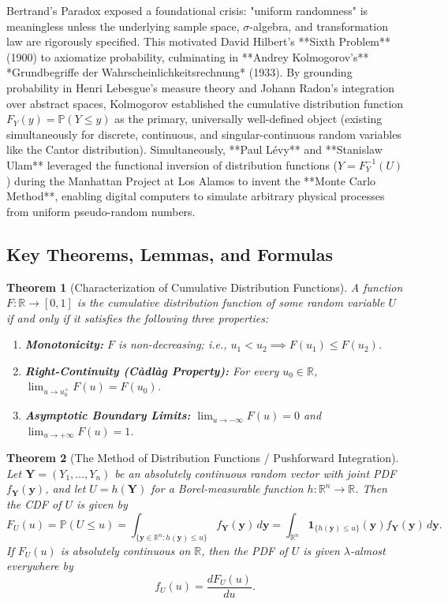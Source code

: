 \documentclass[11pt, letterpaper]{article}
\newtheorem{theorem}{Theorem}[section]
\theoremstyle{definition}
\theoremstyle{remark}
\newcommand{\R}{\mathbb{R}}
\newcommand{\Prob}{\mathbb{P}}
\begin{document}
Bertrand's Paradox exposed a foundational crisis: "uniform randomness" is meaningless unless the underlying sample space, $\sigma$-algebra, and transformation law are rigorously specified. This motivated David Hilbert's **Sixth Problem** (1900) to axiomatize probability, culminating in **Andrey Kolmogorov's** *Grundbegriffe der Wahrscheinlichkeitsrechnung* (1933). By grounding probability in Henri Lebesgue's measure theory and Johann Radon's integration over abstract spaces, Kolmogorov established the cumulative distribution function $F_Y(y) = \Prob(Y \le y)$ as the primary, universally well-defined object (existing simultaneously for discrete, continuous, and singular-continuous random variables like the Cantor distribution). Simultaneously, **Paul L\'{e}vy** and **Stanislaw Ulam** leveraged the functional inversion of distribution functions ($Y = F_Y^{-1}(U)$) during the Manhattan Project at Los Alamos to invent the **Monte Carlo Method**, enabling digital computers to simulate arbitrary physical processes from uniform pseudo-random numbers.

\subsection{Key Theorems, Lemmas, and Formulas}

\begin{theorem}[Characterization of Cumulative Distribution Functions]
A function $F : \R \to [0, 1]$ is the cumulative distribution function of some random variable $U$ if and only if it satisfies the following three properties:
\begin{enumerate}[label=(\roman*)]
    \item \textbf{Monotonicity:} $F$ is non-decreasing; i.e., $u_1 < u_2 \implies F(u_1) \le F(u_2)$.
    \item \textbf{Right-Continuity (C\`{a}dl\`{a}g Property):} For every $u_0 \in \R$, $\lim_{u \to u_0^+} F(u) = F(u_0)$.
    \item \textbf{Asymptotic Boundary Limits:} $\lim_{u \to -\infty} F(u) = 0$ and $\lim_{u \to +\infty} F(u) = 1$.
\end{enumerate}
\end{theorem}

\begin{theorem}[The Method of Distribution Functions / Pushforward Integration]
Let $\mathbf{Y} = (Y_1, \dots, Y_n)$ be an absolutely continuous random vector with joint PDF $f_{\mathbf{Y}}(\mathbf{y})$, and let $U = h(\mathbf{Y})$ for a Borel-measurable function $h : \R^n \to \R$. Then the CDF of $U$ is given by
\[
    F_U(u) = \Prob(U \le u) = \int_{\{\mathbf{y} \in \R^n : h(\mathbf{y}) \le u\}} f_{\mathbf{Y}}(\mathbf{y}) \, d\mathbf{y} = \int_{\R^n} \mathbf{1}_{\{h(\mathbf{y}) \le u\}}(\mathbf{y}) f_{\mathbf{Y}}(\mathbf{y}) \, d\mathbf{y}.
\]
If $F_U(u)$ is absolutely continuous on $\R$, then the PDF of $U$ is given $\lambda$-almost everywhere by
\[
    f_U(u) = \frac{dF_U(u)}{du}.
\]
\end{theorem}
\end{document}
